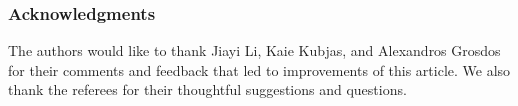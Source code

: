 \documentclass[12pt]{article}
\theoremstyle{definition}
\begin{document}
\subsubsection*{Acknowledgments}
{The authors would like to thank Jiayi Li, Kaie Kubjas, and Alexandros Grosdos for their comments and feedback that led to improvements of this article.}
We also thank the referees for their thoughtful suggestions and questions.
 
\end{document}
